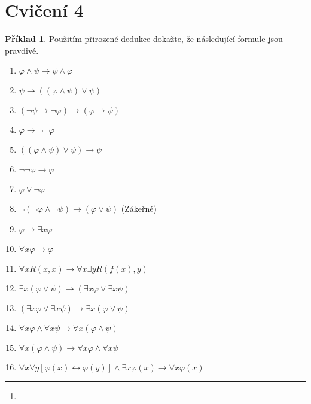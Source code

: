 \documentclass[a4paper]{article}
\theoremstyle{definition}
\newtheorem{priklad}{Příklad}
\begin{document}
\section*{Cvičení 4}
\setcounter{priklad}{0}
\begin{priklad}
    Použitím přirozené dedukce dokažte, že následující formule jsou pravdivé.
    
    \begin{enumerate}
      \item $ \varphi\wedge \psi\rightarrow\psi\wedge\varphi $
      \item $ \psi\rightarrow ((\varphi\wedge\psi)\vee\psi) $
      \item $ (\neg \psi\rightarrow \neg\varphi) \rightarrow (\varphi\rightarrow\psi) $
      \item $ \varphi \rightarrow \neg\neg\varphi $
      \item $ ((\varphi\wedge\psi)\vee\psi) \rightarrow \psi $
      \item $ \neg\neg\varphi \rightarrow \varphi $
      \item $ \varphi\vee \neg\varphi $
      \item $ \neg(\neg\varphi\wedge\neg\psi) \rightarrow (\varphi\vee\psi) $ (Zákeřné)
      \item $ \varphi \rightarrow \exists x\varphi $
      \item $ \forall x\varphi \rightarrow \varphi $
      \item $ \forall xR(x,x) \rightarrow \forall x\exists yR(f(x),y) $
      \item $ \exists x(\varphi\vee\psi) \rightarrow (\exists x\varphi\vee\exists x\psi) $
      \item $ (\exists x\varphi\vee \exists x\psi) \rightarrow \exists x(\varphi\vee\psi) $
      \item $ \forall x\varphi \wedge \forall x\psi \rightarrow \forall x(\varphi\wedge\psi) $
      \item $ \forall x(\varphi\wedge \psi) \rightarrow \forall x\varphi \wedge \forall x\psi $
      \item $ \forall x\forall y[\varphi(x) \leftrightarrow \varphi(y)] \wedge \exists x\varphi(x) \rightarrow \forall x\varphi(x) $
    \end{enumerate}
    
\noindent\rule{\linewidth}{.2pt}

      \begin{enumerate}
      \item
                
      

\end{enumerate}
\end{priklad}
\end{document}
